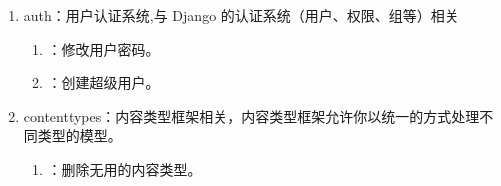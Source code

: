 \begin{enumerate}[label=\arabic*)]
  \item auth：用户认证系统,与 Django 的认证系统（用户、权限、组等）相关
  \begin{enumerate}[itemindent=1em,label=\arabic*)]
    \item {}：修改用户密码。
    \item {}：创建超级用户。
  \end{enumerate}

  \item contenttypes：内容类型框架相关，内容类型框架允许你以统一的方式处理不同类型的模型。
  \begin{enumerate}[itemindent=1em,label=\arabic*)]
    \item {}：删除无用的内容类型。
  \end{enumerate}
  

\end{enumerate}

